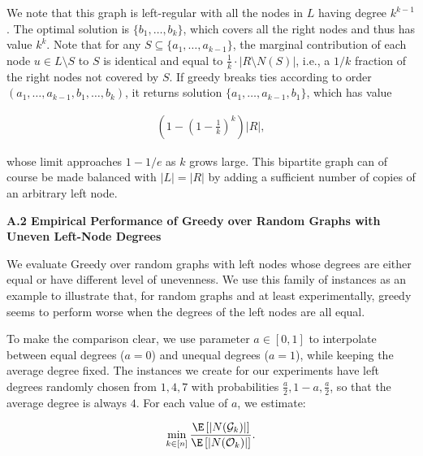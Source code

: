We note that this graph is left-regular with all the nodes in $L$ having degree $k^{k-1}$. The optimal solution is $\{b_{1},\ldots,b_{k}\}$, which covers all the right nodes and thus has value $k^{k}$. Note that for any $S\subseteq\{a_{1},\ldots,a_{k-1}\}$, the marginal contribution of each node $u\in L\setminus S$ to $S$ is identical and equal to $\frac{1}{k}\cdot|R\setminus N(S)|$, i.e., a $1/k$ fraction of the right nodes not covered by $S$. If greedy breaks ties according to order $(a_{1},\ldots,a_{k-1},b_{1},\ldots,b_{k})$, it returns solution $\{a_{1},\ldots,a_{k-1},b_{1}\}$, which has value\par


\[\begin{gathered}
\left(1-\left(1-\frac{1}{k}\right)^{k}\right)|R|,
\end{gathered}\]


whose limit approaches $1-1/e$ as $k$ grows large. This bipartite graph can of course be made balanced with $|L|=|R|$ by adding a sufficient number of copies of an arbitrary left node.\par





\par\medskip\noindent\textbf{A.2 Empirical Performance of Greedy over Random Graphs with Uneven Left-Node Degrees}\par




We evaluate Greedy over random graphs with left nodes whose degrees are either equal or have different level of unevenness. We use this family of instances as an example to illustrate that, for random graphs and at least experimentally, greedy seems to perform worse when the degrees of the left nodes are all equal.\par




To make the comparison clear, we use parameter $a\in[0,1]$ to interpolate between equal degrees ($a=0$) and unequal degrees ($a=1$), while keeping the average degree fixed.
The instances we create for our experiments have left degrees randomly chosen from $1,4,7$ with probabilities $\frac{a}{2},1-a,\frac{a}{2}$, so that the average degree is always $4$.
For each value of $a$, we estimate:\par


\[\begin{gathered}
\displaystyle\min_{k\in[n]}\frac{\E\left[|N(\mathcal{G}_{k})|\right]}{\E\left[|N(\mathcal{O}_{k})|\right]}.
\end{gathered}\]


